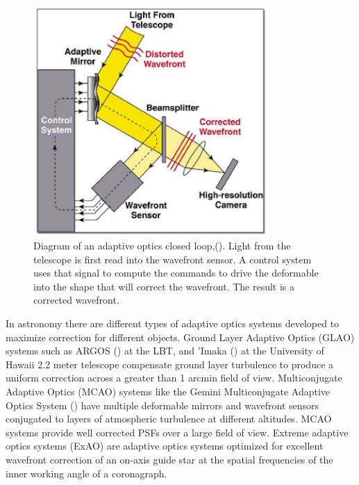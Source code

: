 \begin{figure}
    \centering
    \includegraphics[width=0.8\textwidth]{Chapter Materials/Chapter Two Materials/Adaptive-Optics-System.png}
    \caption{Diagram of an adaptive optics closed loop,(\cite{suarez2017approach}). Light from the telescope is first read into the wavefront sensor. A control system uses that signal to compute the commands to drive the deformable into the shape that will correct the wavefront. The result is a corrected wavefront.}
    \label{fig:AOdiagram}
\end{figure}


In astronomy there are different types of adaptive optics systems developed to maximize correction for different objects. Ground Layer Adaptive Optics (GLAO) systems such as ARGOS (\cite{rabien2019argos}) at the LBT, and 'Imaka (\cite{abdurrahman2018improved}) at the University of Hawaii 2.2 meter telescope compensate ground layer turbulence to produce a uniform correction across a greater than 1 arcmin field of view. Multiconjugate Adaptive Optics (MCAO) systems like the Gemini Multiconjugate Adaptive Optics System (\cite{neichel2014gemini}) have multiple deformable mirrors and wavefront sensors conjugated to layers of atmospheric turbulence at different altitudes. MCAO systems provide well corrected PSFs over a large field of view. Extreme adaptive optics systems (ExAO) are adaptive optics systems optimized for excellent wavefront correction of an on-axis guide star at the spatial frequencies of the inner working angle of a coronagraph. 



